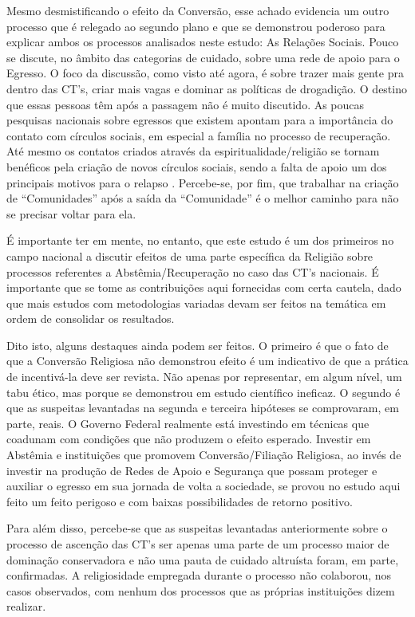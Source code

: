 \documentclass[
	12pt,				%
	oneside,			%
	a4paper,			%
	sumario=tradicional,
	english,			%
	brazil				%
	]{abntex2}
\begin{document}
Mesmo desmistificando o efeito da Conversão, esse achado evidencia um outro processo que é relegado ao segundo plano e que se demonstrou poderoso para explicar ambos os processos analisados neste estudo: As Relações Sociais. Pouco se discute, no âmbito das categorias de cuidado, sobre uma rede de apoio para o Egresso. O foco da discussão, como visto até agora, é sobre trazer mais gente pra dentro das CT's, criar mais vagas e dominar as políticas de drogadição. O destino que essas pessoas têm após a passagem não é muito discutido. As poucas pesquisas nacionais sobre egressos que existem apontam para a importância do contato com círculos sociais, em especial a família \autocite{da2016reinserccao,ramos2018reinserccao} no processo de recuperação. Até mesmo os contatos criados através da espiritualidade/religião se tornam benéficos pela criação de novos círculos sociais, sendo a falta de apoio um dos principais motivos para o relapso \autocite{costa2001processo}. Percebe-se, por fim, que trabalhar na criação de ``Comunidades'' após a saída da ``Comunidade'' é o melhor caminho para não se precisar voltar para ela.

É importante ter em mente, no entanto, que este estudo é um dos primeiros no campo nacional a discutir efeitos de uma parte específica da Religião sobre processos referentes a Abstêmia/Recuperação no caso das CT's nacionais. É importante que se tome as contribuições aqui fornecidas com certa cautela, dado que mais estudos com metodologias variadas devam ser feitos na temática em ordem de consolidar os resultados.

Dito isto, alguns destaques ainda podem ser feitos. O primeiro é que o fato de que a Conversão Religiosa não demonstrou efeito é um indicativo de que a prática de incentivá-la deve ser revista. Não apenas por representar, em algum nível, um tabu ético, mas porque se demonstrou em estudo científico ineficaz. O segundo é que as suspeitas levantadas na segunda e terceira hipóteses se comprovaram, em parte, reais. O Governo Federal realmente está investindo em técnicas que coadunam com condições que não produzem o efeito esperado. Investir em Abstêmia e instituições que promovem Conversão/Filiação Religiosa, ao invés de investir na produção de Redes de Apoio e Segurança que possam proteger e auxiliar o egresso em sua jornada de volta a sociedade, se provou no estudo aqui feito um feito perigoso e com baixas possibilidades de retorno positivo.

Para além disso, percebe-se que as suspeitas levantadas anteriormente sobre o processo de ascenção das CT's ser apenas uma parte de um processo maior de dominação conservadora e não uma pauta de cuidado altruísta foram, em parte, confirmadas. A religiosidade empregada durante o processo não colaborou, nos casos observados, com nenhum dos processos que as próprias instituições dizem realizar.
\end{document}
